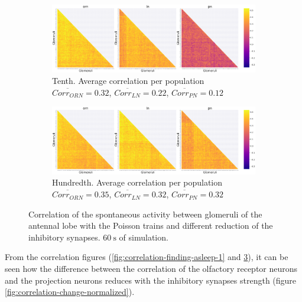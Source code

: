 \begin{figure}
  \begin{subfigure}[t]{\textwidth}
    \centering
    \includegraphics[width=\textwidth]{correlation-tenth-poisson}
    \caption{Tenth. Average correlation per population $\overline{Corr_{ORN}} = 0.32$, $\overline{Corr_{LN}} = 0.22$, $\overline{Corr_{PN}} = 0.12$}
    \label{fig:correlation-tenth-poisson-finding-asleep}
  \end{subfigure}
  \begin{subfigure}[t]{\textwidth}
    \includegraphics[width=\textwidth]{correlation-hundreth-poisson}
    \caption{Hundredth. Average correlation per population $\overline{Corr_{ORN}} = 0.35$, $\overline{Corr_{LN}} = 0.32$, $\overline{Corr_{PN}} = 0.32$}
    \label{fig:correlation-quarter-poisson-finding-asleep}
  \end{subfigure}
  \caption{Correlation of the spontaneous activity between glomeruli of the antennal lobe with the Poisson trains and different reduction of the inhibitory synapses. $\SI{60}{\second}$ of simulation.}
  \label{fig:correlation-finding-asleep-2}
\end{figure}

From the correlation figures (\ref{fig:correlation-finding-asleep-1} and \ref{fig:correlation-finding-asleep-2}), it can be seen how the difference between the correlation of the olfactory receptor neurons and the projection neurons reduces with the inhibitory synapses strength (figure \ref{fig:correlation-change-normalized}).


